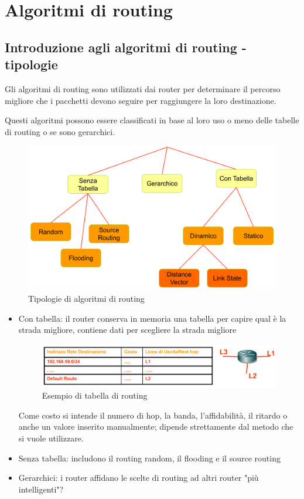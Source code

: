 \section{Algoritmi di routing}
\subsection{Introduzione agli algoritmi di routing - tipologie}
Gli algoritmi di routing sono utilizzati dai router per determinare il percorso migliore che i pacchetti devono seguire per raggiungere la loro destinazione.

Questi algoritmi possono essere classificati in base al loro uso o meno delle tabelle di routing o se sono gerarchici.

\begin{figure}[h!]
    \centering
    \includegraphics[width=1\textwidth]{images/routingtipologie.png}
    \caption{Tipologie di algoritmi di routing}
    \label{fig:routingtipologie}
\end{figure}

\begin{itemize}
    \item Con tabella:  il router conserva in memoria una tabella per capire qual è la strada migliore, contiene dati per scegliere la strada migliore
    \begin{figure}[h!]
        \centering
        \includegraphics[width=1\textwidth]{images/tabellarouting.png}
        \caption{Esempio di tabella di routing}
        \label{fig:tabellarouting}
    \end{figure}
    Come costo si intende il numero di hop, la banda, l'affidabilità, il ritardo o anche un valore inserito manualmente; dipende strettamente dal metodo che si vuole utilizzare.

    \item Senza tabella: includono il routing random, il flooding e il source routing
    
    \item Gerarchici: i router affidano le scelte di routing ad altri router "più intelligenti"?
\end{itemize}

